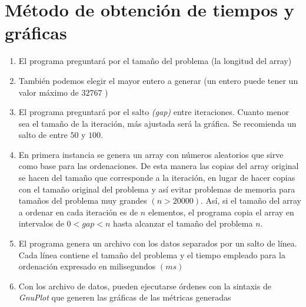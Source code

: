 \section{Método de obtención de tiempos y gráficas}
	\begin{enumerate}
		\item El programa preguntará por el tamaño del problema (la longitud del array)
		\item También podemos elegir el mayor entero a generar (un entero puede tener un valor 				máximo de $32767$ )
		\item El programa preguntará por el salto \emph{(gap)} entre iteraciones.  Cuanto menor 				sea el tamaño de la iteración, más ajustada será la gráfica.  Se recomienda un salto 				de entre $50$ y $100$.
		\item En primera instancia se genera un array con números aleatorios que sirve como base 					para las ordenaciones.  De esta manera las copias del array original se hacen del 					tamaño que corresponde a la iteración, en lugar de hacer copias con el tamaño original 				del problema y así evitar problemas de memoria para tamaños del problema muy grandes 					$(n > 20000)$.  Así, si el tamaño del array a ordenar en cada iteración es de $n$ 					elementos, el programa copia el array en intervalos de $0 < gap < n$ hasta alcanzar el 				tamaño del problema $n$.
		\item El programa genera un archivo con los datos separados por un salto de línea.  Cada 					línea contiene el tamaño del problema y el tiempo empleado para la ordenación expresado 			en milisegundos $(ms)$
		\item Con los archivo de datos, pueden ejecutarse órdenes con la sintaxis de \emph{GnuPlot}
			que generen las gráficas de las métricas generadas 
	\end{enumerate}